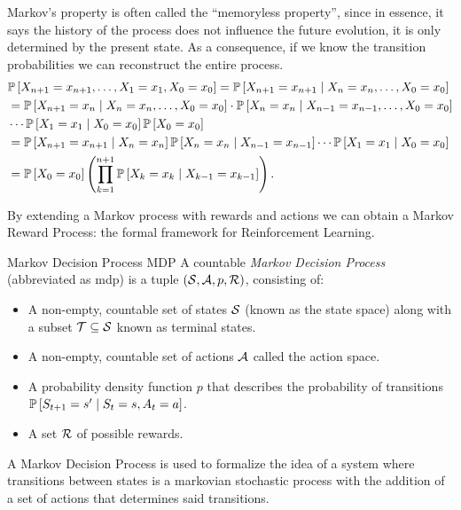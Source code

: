 Markov's property is often called the ``memoryless property'', since in essence,
it says the history of the process does not influence the future evolution, it
is only determined by the present state. As a consequence, if we know the
transition probabilities we can reconstruct the entire process.
\begin{align}
    \label{eq:markov-sequence}
    & \mathbb{P}\left[X_{n+1} = x_{n+1}, \dots, X_1 = x_1, X_0 = x_0\right] = \mathbb{P}\left[X_{n+1} = x_{n+1} \mid X_n = x_n, \dots, X_0 = x_0\right] \nonumber \\
    &= \mathbb{P}\left[X_{n+1} = x_n \mid X_{n} = x_n, \dots, X_0 = x_0\right] \cdot \mathbb{P}\left[X_n = x_n \mid X_{n-1} = x_{n-1}, \dots, X_0 = x_0\right] \nonumber \\
    &\cdots \mathbb{P}\left[X_1 = x_1 \mid X_0 = x_0\right] \mathbb{P}\left[X_0 = x_0\right] \nonumber \\
    &= \mathbb{P}\left[X_{n+1} = x_{n+1} \mid X_n = x_n\right] \mathbb{P}\left[X_n = x_n \mid X_{n-1} = x_{n-1}\right] \cdots \mathbb{P}\left[X_1 = x_1 \mid X_0 = x_0\right] \nonumber \\
    &= \mathbb{P}\left[X_0 = x_0\right] \left( \prod_{k=1}^{n+1} \mathbb{P}\left[X_k = x_k \mid X_{k-1} = x_{k-1}\right] \right).
\end{align}

By extending a Markov process with rewards and actions we can obtain a Markov
Reward Process: the formal framework for Reinforcement Learning.

\begin{dfn}{Markov Decision Process \cite[Lec.~2]{silver2015}}{MDP}
    A countable \emph{Markov Decision Process} (abbreviated as \ac{mdp}) is a tuple
    $(\mathcal{S}, \mathcal{A}, p, \mathcal{R})$, consisting of:
    \begin{itemize}
        \item A non-empty, countable set of states $\mathcal{S}$ (known as the state
            space) along with a subset $\mathcal{T} \subseteq \mathcal{S}$ known as
            terminal states. 
        \item A non-empty, countable set of actions $\mathcal{A}$ called the action
            space.
        \item A probability density function $p$ that describes the probability
            of transitions $\mathbb{P}\left[S_{t+1} = s' \mid S_t = s, A_t = a\right]$.
        \item A set $\mathcal{R}$ of possible rewards.
    \end{itemize}
\end{dfn}

A Markov Decision Process is used to formalize the idea of a system where
transitions between states is a markovian stochastic process with the addition
of a set of actions that determines said transitions. 